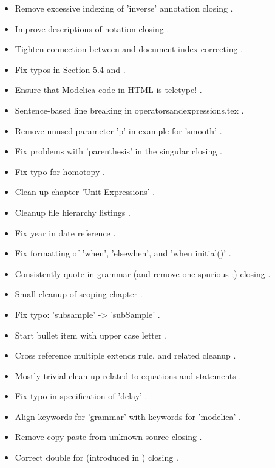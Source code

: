 \begin{itemize}
\begin{itemize}
\item Remove excessive indexing of 'inverse' annotation  closing .
\item Improve descriptions of notation  closing .
\item Tighten connection between \firstuse and document index  correcting  .
\item Fix typos in Section 5.4  and .
\item Ensure that Modelica code in HTML is teletype! .
\item Sentence-based line breaking in operatorsandexpressions.tex .
\item Remove unused parameter 'p' in example for 'smooth' .
\item Fix problems with 'parenthesis' in the singular  closing .
\item Fix typo for homotopy .
\item Clean up chapter 'Unit Expressions' .
\item Cleanup file hierarchy listings .
\item Fix year in date reference .
\item Fix formatting of 'when', 'elsewhen', and 'when initial()' .
\item Consistently quote in grammar (and remove one spurious ;)  closing .
\item Small cleanup of scoping chapter .
\item Fix typo: 'subsample' -> 'subSample' .
\item Start bullet item with upper case letter .
\item Cross reference multiple extends rule, and related cleanup .
\item Mostly trivial clean up related to equations and statements .
\item Fix typo in specification of 'delay' .
\item Align keywords for 'grammar' with keywords for 'modelica' .
\item Remove copy-paste from unknown source  closing .
\item Correct double for (introduced in )  closing .

\end{itemize}
\end{itemize}

